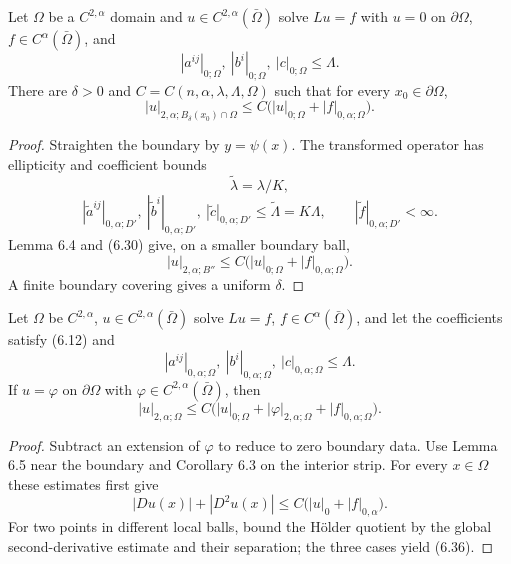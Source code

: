 \begin{lemma}
\label{gt-ch06-lem-6-5}
Let $\Omega$ be a $C^{2,\alpha}$ domain and $u\in C^{2,\alpha}(\bar\Omega)$ solve
$Lu=f$ with $u=0$ on $\partial\Omega$, $f\in C^\alpha(\bar\Omega)$, and
\begin{equation}\tag{6.31}
|a^{ij}|_{0;\Omega},\ |b^i|_{0;\Omega},\ |c|_{0;\Omega}\le\Lambda.
\end{equation}
There are $\delta>0$ and $C=C(n,\alpha,\lambda,\Lambda,\Omega)$ such that
for every $x_0\in\partial\Omega$,
\begin{equation}\tag{6.32}
|u|_{2,\alpha;B_\delta(x_0)\cap\Omega}
\le C\bigl(|u|_{0;\Omega}+|f|_{0,\alpha;\Omega}\bigr).
\end{equation}
\end{lemma}
\begin{proof}
\sketch Straighten the boundary by $y=\psi(x)$. The transformed operator has
ellipticity and coefficient bounds
\begin{equation}
\tag{6.33}
\widetilde\lambda=\lambda/K,
\end{equation}
\begin{equation}
\tag{6.34}
|\widetilde a^{ij}|_{0,\alpha;D'},\
|\widetilde b^i|_{0,\alpha;D'},\
|\widetilde c|_{0,\alpha;D'}
\leq\widetilde\Lambda=K\Lambda,
\qquad |\widetilde f|_{0,\alpha;D'}<\infty.
\end{equation}
Lemma 6.4 and (6.30) give, on a smaller boundary ball,
\begin{equation}
\tag{6.35}
|u|_{2,\alpha;B''}
\leq C\bigl(|u|_{0;\Omega}+|f|_{0,\alpha;\Omega}\bigr).
\end{equation}
A finite boundary covering gives a uniform $\delta$.
\end{proof}

\begin{theorem}
\label{gt-ch06-thm-6-6}
\dcref{ch6:6.6}
Let $\Omega$ be $C^{2,\alpha}$, $u\in C^{2,\alpha}(\bar\Omega)$ solve $Lu=f$,
$f\in C^\alpha(\bar\Omega)$, and let the coefficients satisfy (6.12) and
\[
|a^{ij}|_{0,\alpha;\Omega},\ |b^i|_{0,\alpha;\Omega},\ |c|_{0,\alpha;\Omega}\le\Lambda.
\]
If $u=\varphi$ on $\partial\Omega$ with $\varphi\in C^{2,\alpha}(\bar\Omega)$,
then
\begin{equation}\tag{6.36}
|u|_{2,\alpha;\Omega}\le C\bigl(|u|_{0;\Omega}+|\varphi|_{2,\alpha;\Omega}+|f|_{0,\alpha;\Omega}\bigr).
\end{equation}
\end{theorem}
\begin{proof}
\sketch Subtract an extension of $\varphi$ to reduce to zero boundary data.
Use Lemma 6.5 near the boundary and Corollary 6.3 on the interior strip.  For
every $x\in\Omega$ these estimates first give
\begin{equation}
\tag{6.37}
|Du(x)|+|D^2u(x)|
\leq C\bigl(|u|_0+|f|_{0,\alpha}\bigr).
\end{equation}
For
two points in different local balls, bound the H\"older quotient by the global
second-derivative estimate and their separation; the three cases yield (6.36).
\end{proof}

